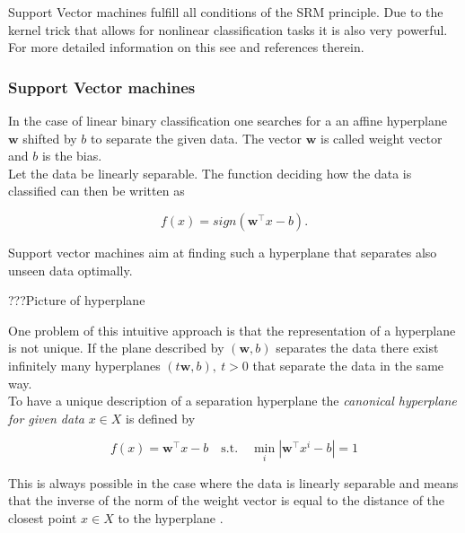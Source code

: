 
Support Vector machines fulfill all conditions of the SRM principle. Due to the kernel trick that allows for nonlinear classification tasks it is also very powerful. For more detailed information on this see \cite{Kunapuli2008, Vapnik1998} and references therein.

\subsubsection{Support Vector machines}

In the case of linear binary classification one searches for a an affine hyperplane \(\bm{w}\) shifted by \(b\) to separate the given data. The vector \(\bm{w}\) is called weight vector and \(b\) is the bias. \\
Let the data be linearly separable. The function deciding how the data is classified can then be written as

\[ f(x) = sign(\bm{w}^{\top}x-b). \]

Support vector machines aim at finding such a hyperplane that separates also unseen data optimally.

???Picture of hyperplane

One problem of this intuitive approach is that the representation of a hyperplane is not unique. If the plane described by \((\bm{w},b)\) separates the data there exist infinitely many hyperplanes \((t\bm{w},b), ~ t>0\) that separate the data in the same way. \\
To have a unique description of a separation hyperplane the \emph{canonical hyperplane for given data} \(x \in X\) is defined by 

\[ f(x) = \bm{w}^{\top} x - b  \quad \text{s.t.} \quad \min_i |\bm{w}^{\top}x^i-b| = 1\] 

This is always possible in the case where the data is  linearly separable and means that the inverse of the norm of the weight vector is equal to the distance of the closest point \(x \in X \) to  the hyperplane \cite{Kunapuli2008}.



